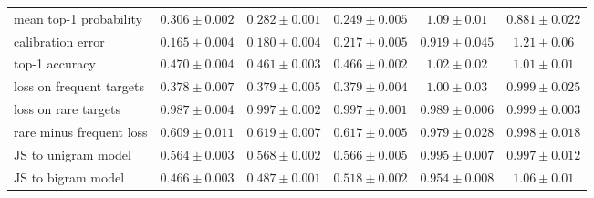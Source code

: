 \begin{center}
\begin{minipage}{\linewidth}
\begin{tabular}{@{}l|ccc|cc@{}}
mean top-1 probability & $0.306 \pm 0.002$ & $0.282 \pm 0.001$ & $0.249 \pm 0.005$ & $1.09 \pm 0.01$ & $0.881 \pm 0.022$ \\
calibration error & $0.165 \pm 0.004$ & $0.180 \pm 0.004$ & $0.217 \pm 0.005$ & $0.919 \pm 0.045$ & $1.21 \pm 0.06$ \\
top-1 accuracy & $0.470 \pm 0.004$ & $0.461 \pm 0.003$ & $0.466 \pm 0.002$ & $1.02 \pm 0.02$ & $1.01 \pm 0.01$ \\
loss on frequent targets & $0.378 \pm 0.007$ & $0.379 \pm 0.005$ & $0.379 \pm 0.004$ & $1.00 \pm 0.03$ & $0.999 \pm 0.025$ \\
loss on rare targets & $0.987 \pm 0.004$ & $0.997 \pm 0.002$ & $0.997 \pm 0.001$ & $0.989 \pm 0.006$ & $0.999 \pm 0.003$ \\
rare minus frequent loss & $0.609 \pm 0.011$ & $0.619 \pm 0.007$ & $0.617 \pm 0.005$ & $0.979 \pm 0.028$ & $0.998 \pm 0.018$ \\
JS to unigram model & $0.564 \pm 0.003$ & $0.568 \pm 0.002$ & $0.566 \pm 0.005$ & $0.995 \pm 0.007$ & $0.997 \pm 0.012$ \\
JS to bigram model & $0.466 \pm 0.003$ & $0.487 \pm 0.001$ & $0.518 \pm 0.002$ & $0.954 \pm 0.008$ & $1.06 \pm 0.01$ \\
\end{tabular}\end{minipage}
\end{center}


